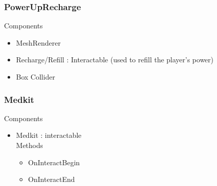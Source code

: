 \documentclass[11pt]{article}
\begin{document}
\subsubsection{PowerUpRecharge}
Components
\begin{itemize}
\item MeshRenderer
\item Recharge/Refill : Interactable (used to refill the player’s power)
\item Box Collider
\end{itemize}

\subsubsection{Medkit}
Components
\begin{itemize}
\item Medkit : interactable
\\Methods
\begin{itemize}
\item OnInteractBegin
\item OnInteractEnd
\end{itemize}
\end{itemize}
\end{document}
